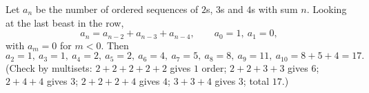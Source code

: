 Let $a_n$ be the number of ordered sequences of $2$s, $3$s and $4$s with sum $n$. Looking at the last beast in the row,
\[
a_n=a_{n-2}+a_{n-3}+a_{n-4},\qquad a_0=1,\ a_1=0,
\]
with $a_m=0$ for $m<0$. Then
\[
a_2=1,\ a_3=1,\ a_4=2,\ a_5=2,\ a_6=4,\ a_7=5,\ a_8=8,\ a_9=11,\ a_{10}=8+5+4=\boxed{17}.
\]
(Check by multisets: $2+2+2+2+2$ gives $1$ order; $2+2+3+3$ gives $6$; $2+4+4$ gives $3$; $2+2+2+4$ gives $4$; $3+3+4$ gives $3$; total $17$.)
